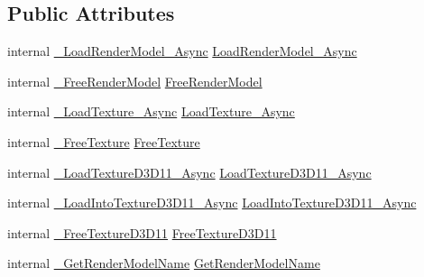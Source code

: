 \subsection*{Public Attributes}
\begin{DoxyCompactItemize}
\item 
internal \mbox{\hyperlink{struct_valve_1_1_v_r_1_1_i_v_r_render_models_aaf7ab82d1e0d29b1f2c7c23444deaa11}{\+\_\+\+Load\+Render\+Model\+\_\+\+Async}} \mbox{\hyperlink{struct_valve_1_1_v_r_1_1_i_v_r_render_models_a5f14a839ffa684d80b4d567c024f7c2e}{Load\+Render\+Model\+\_\+\+Async}}
\item 
internal \mbox{\hyperlink{struct_valve_1_1_v_r_1_1_i_v_r_render_models_a4fa1104771d8555a178db0ff8c817849}{\+\_\+\+Free\+Render\+Model}} \mbox{\hyperlink{struct_valve_1_1_v_r_1_1_i_v_r_render_models_ad09b53c1abe23e37e1ae6b75349ccfd8}{Free\+Render\+Model}}
\item 
internal \mbox{\hyperlink{struct_valve_1_1_v_r_1_1_i_v_r_render_models_a5c61ffd1a998ea69d3c9551c22524886}{\+\_\+\+Load\+Texture\+\_\+\+Async}} \mbox{\hyperlink{struct_valve_1_1_v_r_1_1_i_v_r_render_models_a828f7c091584a7a023e0c2a1acf9d28e}{Load\+Texture\+\_\+\+Async}}
\item 
internal \mbox{\hyperlink{struct_valve_1_1_v_r_1_1_i_v_r_render_models_ac4a47c1b699bbc29965d6ebd54895fe0}{\+\_\+\+Free\+Texture}} \mbox{\hyperlink{struct_valve_1_1_v_r_1_1_i_v_r_render_models_a0b8315d6a5b3731b76a76a791769e989}{Free\+Texture}}
\item 
internal \mbox{\hyperlink{struct_valve_1_1_v_r_1_1_i_v_r_render_models_ab99d05c13fa1b637219e1b307adbf13f}{\+\_\+\+Load\+Texture\+D3\+D11\+\_\+\+Async}} \mbox{\hyperlink{struct_valve_1_1_v_r_1_1_i_v_r_render_models_a8baea7d71d96ab003e8c552187ad4652}{Load\+Texture\+D3\+D11\+\_\+\+Async}}
\item 
internal \mbox{\hyperlink{struct_valve_1_1_v_r_1_1_i_v_r_render_models_a819d498723194d075a7e114272dce441}{\+\_\+\+Load\+Into\+Texture\+D3\+D11\+\_\+\+Async}} \mbox{\hyperlink{struct_valve_1_1_v_r_1_1_i_v_r_render_models_a1f79607150d419aba923b85209d1ea24}{Load\+Into\+Texture\+D3\+D11\+\_\+\+Async}}
\item 
internal \mbox{\hyperlink{struct_valve_1_1_v_r_1_1_i_v_r_render_models_a64addc40cba89770ceaf1e258ab4d793}{\+\_\+\+Free\+Texture\+D3\+D11}} \mbox{\hyperlink{struct_valve_1_1_v_r_1_1_i_v_r_render_models_a447587837a0cfe26138e71f7e55ff016}{Free\+Texture\+D3\+D11}}
\item 
internal \mbox{\hyperlink{struct_valve_1_1_v_r_1_1_i_v_r_render_models_a82dc27ff6d6b45e1ef3957429bf65c1e}{\+\_\+\+Get\+Render\+Model\+Name}} \mbox{\hyperlink{struct_valve_1_1_v_r_1_1_i_v_r_render_models_ac3a3651484bad309acb66e2229d255d2}{Get\+Render\+Model\+Name}}

\end{DoxyCompactItemize}
